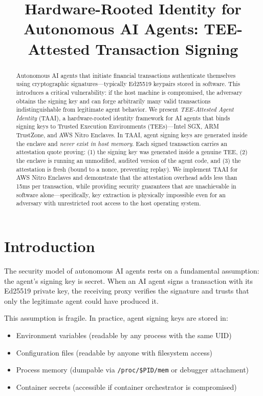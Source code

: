 \documentclass[conference]{IEEEtran}
\title{Hardware-Rooted Identity for Autonomous AI Agents: TEE-Attested Transaction Signing}
\author{
\IEEEauthorblockN{Atrosha Research}
\IEEEauthorblockA{Atrosha Labs}
}
\begin{document}
\maketitle

\begin{abstract}
Autonomous AI agents that initiate financial transactions authenticate themselves using cryptographic signatures---typically Ed25519 keypairs stored in software. This introduces a critical vulnerability: if the host machine is compromised, the adversary obtains the signing key and can forge arbitrarily many valid transactions indistinguishable from legitimate agent behavior. We present \textit{TEE-Attested Agent Identity} (TAAI), a hardware-rooted identity framework for AI agents that binds signing keys to Trusted Execution Environments (TEEs)---Intel SGX, ARM TrustZone, and AWS Nitro Enclaves. In TAAI, agent signing keys are generated inside the enclave and \textit{never exist in host memory}. Each signed transaction carries an attestation quote proving: (1) the signing key was generated inside a genuine TEE, (2) the enclave is running an unmodified, audited version of the agent code, and (3) the attestation is fresh (bound to a nonce, preventing replay). We implement TAAI for AWS Nitro Enclaves and demonstrate that the attestation overhead adds less than 15ms per transaction, while providing security guarantees that are unachievable in software alone---specifically, key extraction is physically impossible even for an adversary with unrestricted root access to the host operating system.
\end{abstract}

\section{Introduction}

The security model of autonomous AI agents rests on a fundamental assumption: the agent's signing key is secret. When an AI agent signs a transaction with its Ed25519 private key, the receiving proxy verifies the signature and trusts that only the legitimate agent could have produced it.

This assumption is fragile. In practice, agent signing keys are stored in:
\begin{itemize}
    \item Environment variables (readable by any process with the same UID)
    \item Configuration files (readable by anyone with filesystem access)
    \item Process memory (dumpable via \texttt{/proc/\$PID/mem} or debugger attachment)
    \item Container secrets (accessible if container orchestrator is compromised)
\end{itemize}
\end{document}
